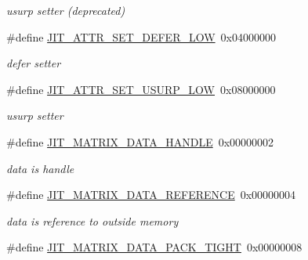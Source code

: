 \begin{DoxyCompactItemize}
\begin{DoxyCompactList}\small\item\em usurp setter (deprecated) \item\end{DoxyCompactList}\item 
\hypertarget{group__jitter_gaf76b6ca84610d13c1276c51afc2b10ba}{
\#define \hyperlink{group__jitter_gaf76b6ca84610d13c1276c51afc2b10ba}{JIT\_\-ATTR\_\-SET\_\-DEFER\_\-LOW}~0x04000000}
\label{group__jitter_gaf76b6ca84610d13c1276c51afc2b10ba}

\begin{DoxyCompactList}\small\item\em defer setter \item\end{DoxyCompactList}\item 
\hypertarget{group__jitter_ga2ffda4034665d46f65461d67b1004715}{
\#define \hyperlink{group__jitter_ga2ffda4034665d46f65461d67b1004715}{JIT\_\-ATTR\_\-SET\_\-USURP\_\-LOW}~0x08000000}
\label{group__jitter_ga2ffda4034665d46f65461d67b1004715}

\begin{DoxyCompactList}\small\item\em usurp setter \item\end{DoxyCompactList}\item 
\hypertarget{group__jitter_gaeb64c758a0a5e003c4b275da17170dbf}{
\#define \hyperlink{group__jitter_gaeb64c758a0a5e003c4b275da17170dbf}{JIT\_\-MATRIX\_\-DATA\_\-HANDLE}~0x00000002}
\label{group__jitter_gaeb64c758a0a5e003c4b275da17170dbf}

\begin{DoxyCompactList}\small\item\em data is handle \item\end{DoxyCompactList}\item 
\hypertarget{group__jitter_ga524952b91ca521028ba5cbd43bbdb2bf}{
\#define \hyperlink{group__jitter_ga524952b91ca521028ba5cbd43bbdb2bf}{JIT\_\-MATRIX\_\-DATA\_\-REFERENCE}~0x00000004}
\label{group__jitter_ga524952b91ca521028ba5cbd43bbdb2bf}

\begin{DoxyCompactList}\small\item\em data is reference to outside memory \item\end{DoxyCompactList}\item 
\hypertarget{group__jitter_ga8d2975bb5165583d45ea766784e5a60b}{
\#define \hyperlink{group__jitter_ga8d2975bb5165583d45ea766784e5a60b}{JIT\_\-MATRIX\_\-DATA\_\-PACK\_\-TIGHT}~0x00000008}
\label{group__jitter_ga8d2975bb5165583d45ea766784e5a60b}


\end{DoxyCompactItemize}

